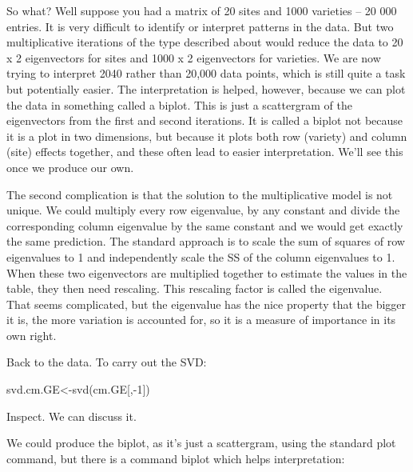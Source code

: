 \documentclass[
]{book}
\newenvironment{Shaded}{\begin{snugshade}}{\end{snugshade}}
\newcommand{\DecValTok}[1]{\textcolor[rgb]{0.00,0.00,0.81}{#1}}
\newcommand{\FunctionTok}[1]{\textcolor[rgb]{0.00,0.00,0.00}{#1}}
\newcommand{\NormalTok}[1]{#1}
\newcommand{\OtherTok}[1]{\textcolor[rgb]{0.56,0.35,0.01}{#1}}
\newcommand{\SpecialCharTok}[1]{\textcolor[rgb]{0.00,0.00,0.00}{#1}}
\begin{document}
So what? Well suppose you had a matrix of 20 sites and 1000 varieties -- 20 000 entries. It is very difficult to identify or interpret patterns in the data. But two multiplicative iterations of the type described about would reduce the data to 20 x 2 eigenvectors for sites and 1000 x 2 eigenvectors for varieties. We are now trying to interpret 2040 rather than 20,000 data points, which is still quite a task but potentially easier. The interpretation is helped, however, because we can plot the data in something called a biplot. This is just a scattergram of the eigenvectors from the first and second iterations. It is called a biplot not because it is a plot in two dimensions, but because it plots both row (variety) and column (site) effects together, and these often lead to easier interpretation. We'll see this once we produce our own.

The second complication is that the solution to the multiplicative model is not unique. We could multiply every row eigenvalue, by any constant and divide the corresponding column eigenvalue by the same constant and we would get exactly the same prediction. The standard approach is to scale the sum of squares of row eigenvalues to 1 and independently scale the SS of the column eigenvalues to 1. When these two eigenvectors are multiplied together to estimate the values in the table, they then need rescaling. This rescaling factor is called the eigenvalue. That seems complicated, but the eigenvalue has the nice property that the bigger it is, the more variation is accounted for, so it is a measure of importance in its own right.

Back to the data. To carry out the SVD:

\begin{Shaded}
\begin{Highlighting}[]
\NormalTok{svd.cm.GE}\OtherTok{\textless{}{-}}\FunctionTok{svd}\NormalTok{(cm.GE[,}\SpecialCharTok{{-}}\DecValTok{1}\NormalTok{])}
\end{Highlighting}
\end{Shaded}

Inspect. We can discuss it.

We could produce the biplot, as it's just a scattergram, using the standard plot command, but there is a command biplot which helps interpretation:

\begin{Shaded}
\end{Shaded}
\end{document}
